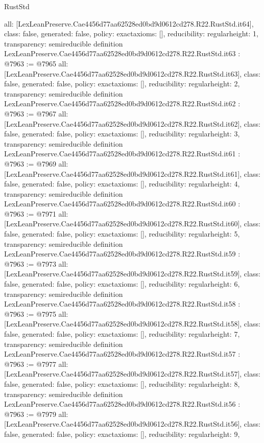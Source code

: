 \begin{lexlean}{RustStd}
\begin{coremodule}
{  all: [LexLeanPreserve.Cae4456d77aa62528ed0bd9d0612cd278.R22.RustStd.it64],
  class: false,
  generated: false,
  policy: exact{axioms: []},
  reducibility: regular{height: 1},
  transparency: semireducible
}
definition LexLeanPreserve.Cae4456d77aa62528ed0bd9d0612cd278.R22.RustStd.it63 : @7963 := @7965 {
  all: [LexLeanPreserve.Cae4456d77aa62528ed0bd9d0612cd278.R22.RustStd.it63],
  class: false,
  generated: false,
  policy: exact{axioms: []},
  reducibility: regular{height: 2},
  transparency: semireducible
}
definition LexLeanPreserve.Cae4456d77aa62528ed0bd9d0612cd278.R22.RustStd.it62 : @7963 := @7967 {
  all: [LexLeanPreserve.Cae4456d77aa62528ed0bd9d0612cd278.R22.RustStd.it62],
  class: false,
  generated: false,
  policy: exact{axioms: []},
  reducibility: regular{height: 3},
  transparency: semireducible
}
definition LexLeanPreserve.Cae4456d77aa62528ed0bd9d0612cd278.R22.RustStd.it61 : @7963 := @7969 {
  all: [LexLeanPreserve.Cae4456d77aa62528ed0bd9d0612cd278.R22.RustStd.it61],
  class: false,
  generated: false,
  policy: exact{axioms: []},
  reducibility: regular{height: 4},
  transparency: semireducible
}
definition LexLeanPreserve.Cae4456d77aa62528ed0bd9d0612cd278.R22.RustStd.it60 : @7963 := @7971 {
  all: [LexLeanPreserve.Cae4456d77aa62528ed0bd9d0612cd278.R22.RustStd.it60],
  class: false,
  generated: false,
  policy: exact{axioms: []},
  reducibility: regular{height: 5},
  transparency: semireducible
}
definition LexLeanPreserve.Cae4456d77aa62528ed0bd9d0612cd278.R22.RustStd.it59 : @7963 := @7973 {
  all: [LexLeanPreserve.Cae4456d77aa62528ed0bd9d0612cd278.R22.RustStd.it59],
  class: false,
  generated: false,
  policy: exact{axioms: []},
  reducibility: regular{height: 6},
  transparency: semireducible
}
definition LexLeanPreserve.Cae4456d77aa62528ed0bd9d0612cd278.R22.RustStd.it58 : @7963 := @7975 {
  all: [LexLeanPreserve.Cae4456d77aa62528ed0bd9d0612cd278.R22.RustStd.it58],
  class: false,
  generated: false,
  policy: exact{axioms: []},
  reducibility: regular{height: 7},
  transparency: semireducible
}
definition LexLeanPreserve.Cae4456d77aa62528ed0bd9d0612cd278.R22.RustStd.it57 : @7963 := @7977 {
  all: [LexLeanPreserve.Cae4456d77aa62528ed0bd9d0612cd278.R22.RustStd.it57],
  class: false,
  generated: false,
  policy: exact{axioms: []},
  reducibility: regular{height: 8},
  transparency: semireducible
}
definition LexLeanPreserve.Cae4456d77aa62528ed0bd9d0612cd278.R22.RustStd.it56 : @7963 := @7979 {
  all: [LexLeanPreserve.Cae4456d77aa62528ed0bd9d0612cd278.R22.RustStd.it56],
  class: false,
  generated: false,
  policy: exact{axioms: []},
  reducibility: regular{height: 9},
}
\end{coremodule}
\end{lexlean}
